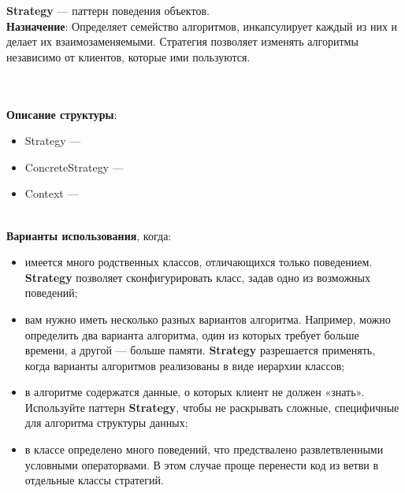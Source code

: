 \documentclass[a3paper,11pt]{report}
\def \boxSize {7cm}
\begin{document}
\large\textbf{Strategy} --- паттерн поведения объектов.
\\
\large\textbf{Назначение}: Определяет семейство алгоритмов, инкапсулирует каждый из них и делает их взаимозаменяемыми. Стратегия позволяет изменять алгоритмы независимо от клиентов, которые ими пользуются.
\\

\\\\
\textbf{Описание структуры}:
\begin{itemize}
\item Strategy ---
\item ConcreteStrategy ---
\item Context ---
\end{itemize}

\large\textbf{\\Варианты использования}, когда:
\begin{itemize}
\item имеется много родственных классов, отличающихся только поведением. \textbf{Strategy} позволяет сконфигурировать класс, задав одно из возможных поведений;
\item вам нужно иметь несколько разных вариантов алгоритма. Например, можно определить два варианта алгоритма, один из которых требует больше времени, а другой --- больше памяти. \textbf{Strategy} разрешается применять, когда варианты алгоритмов реализованы в виде иерархии классов;
\item в алгоритме содержатся данные, о которых клиент не должен «знать». Используйте паттерн \textbf{Strategy}, чтобы не раскрывать сложные, специфичные для алгоритма структуры данных;
\item в классе определено много поведений, что предствалено развлетвленными условными операторвами. В этом случае проще перенести код из ветви в отдельные классы стратегий.
\end{itemize}
\end{document}
